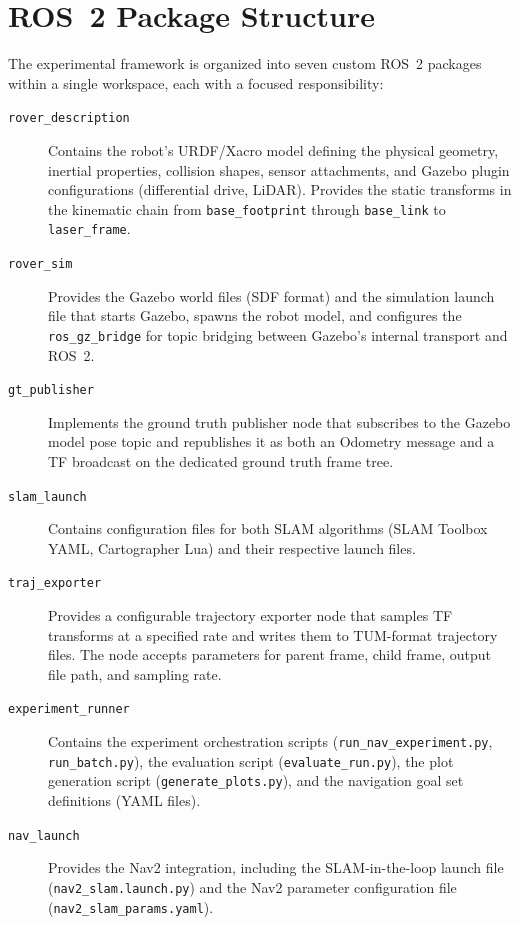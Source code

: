 \section{ROS~2 Package Structure}

The experimental framework is organized into seven custom ROS~2 packages within a single workspace, each with a focused responsibility:

\begin{description}
\item[\texttt{rover\_description}] Contains the robot's URDF/Xacro model defining the physical geometry, inertial properties, collision shapes, sensor attachments, and Gazebo plugin configurations (differential drive, LiDAR). Provides the static transforms in the kinematic chain from \texttt{base\_footprint} through \texttt{base\_link} to \texttt{laser\_frame}.

\item[\texttt{rover\_sim}] Provides the Gazebo world files (SDF format) and the simulation launch file that starts Gazebo, spawns the robot model, and configures the \texttt{ros\_gz\_bridge} for topic bridging between Gazebo's internal transport and ROS~2.

\item[\texttt{gt\_publisher}] Implements the ground truth publisher node that subscribes to the Gazebo model pose topic and republishes it as both an Odometry message and a TF broadcast on the dedicated ground truth frame tree.

\item[\texttt{slam\_launch}] Contains configuration files for both SLAM algorithms (SLAM Toolbox YAML, Cartographer Lua) and their respective launch files.

\item[\texttt{traj\_exporter}] Provides a configurable trajectory exporter node that samples TF transforms at a specified rate and writes them to TUM-format trajectory files. The node accepts parameters for parent frame, child frame, output file path, and sampling rate.

\item[\texttt{experiment\_runner}] Contains the experiment orchestration scripts (\texttt{run\_nav\_experiment.py}, \texttt{run\_batch.py}), the evaluation script (\texttt{evaluate\_run.py}), the plot generation script (\texttt{generate\_plots.py}), and the navigation goal set definitions (YAML files).

\item[\texttt{nav\_launch}] Provides the Nav2 integration, including the SLAM-in-the-loop launch file (\texttt{nav2\_slam.launch.py}) and the Nav2 parameter configuration file (\texttt{nav2\_slam\_params.yaml}).
\end{description}

